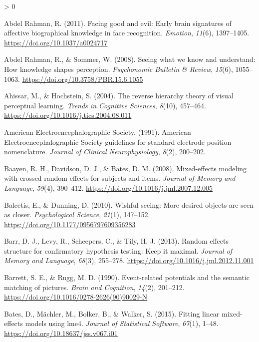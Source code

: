 \documentclass[
  english,
  doc,12pt,twoside,floatsintext]{apa7}
\newlength{\cslhangindent}
\newenvironment{CSLReferences}[2] %
 {%
  \setlength{\parindent}{0pt}
  \ifodd #1 \everypar{\setlength{\hangindent}{\cslhangindent}}\ignorespaces\fi
  \ifnum #2 > 0
  \setlength{\parskip}{#2\baselineskip}
  \fi
 }%
 {}
\begin{document}
\hypertarget{refs}{}
\begin{CSLReferences}{1}{0}
\leavevmode\hypertarget{ref-abdelrahman2011}{}%
Abdel Rahman, R. (2011). Facing good and evil: Early brain signatures of affective biographical knowledge in face recognition. \emph{Emotion}, \emph{11}(6), 1397--1405. \url{https://doi.org/10.1037/a0024717}

\leavevmode\hypertarget{ref-abdelrahman2008}{}%
Abdel Rahman, R., \& Sommer, W. (2008). Seeing what we know and understand: How knowledge shapes perception. \emph{Psychonomic Bulletin \& Review}, \emph{15}(6), 1055--1063. \url{https://doi.org/10.3758/PBR.15.6.1055}

\leavevmode\hypertarget{ref-ahissar2004}{}%
Ahissar, M., \& Hochstein, S. (2004). The reverse hierarchy theory of visual perceptual learning. \emph{Trends in Cognitive Sciences}, \emph{8}(10), 457--464. \url{https://doi.org/10.1016/j.tics.2004.08.011}

\leavevmode\hypertarget{ref-americanelectroencephalographicsociety1991}{}%
American Electroencephalographic Society. (1991). {American Electroencephalographic Society} guidelines for standard electrode position nomenclature. \emph{Journal of Clinical Neurophysiology}, \emph{8}(2), 200--202.

\leavevmode\hypertarget{ref-baayen2008}{}%
Baayen, R. H., Davidson, D. J., \& Bates, D. M. (2008). Mixed-effects modeling with crossed random effects for subjects and items. \emph{Journal of Memory and Language}, \emph{59}(4), 390--412. \url{https://doi.org/10.1016/j.jml.2007.12.005}

\leavevmode\hypertarget{ref-balcetis2010}{}%
Balcetis, E., \& Dunning, D. (2010). Wishful seeing: More desired objects are seen as closer. \emph{Psychological Science}, \emph{21}(1), 147--152. \url{https://doi.org/10.1177/0956797609356283}

\leavevmode\hypertarget{ref-barr2013}{}%
Barr, D. J., Levy, R., Scheepers, C., \& Tily, H. J. (2013). Random effects structure for confirmatory hypothesis testing: Keep it maximal. \emph{Journal of Memory and Language}, \emph{68}(3), 255--278. \url{https://doi.org/10.1016/j.jml.2012.11.001}

\leavevmode\hypertarget{ref-barrett1990}{}%
Barrett, S. E., \& Rugg, M. D. (1990). Event-related potentials and the semantic matching of pictures. \emph{Brain and Cognition}, \emph{14}(2), 201--212. \url{https://doi.org/10.1016/0278-2626(90)90029-N}

\leavevmode\hypertarget{ref-R-lme4}{}%
Bates, D., Mächler, M., Bolker, B., \& Walker, S. (2015). Fitting linear mixed-effects models using {lme4}. \emph{Journal of Statistical Software}, \emph{67}(1), 1--48. \url{https://doi.org/10.18637/jss.v067.i01}


\end{CSLReferences}
\end{document}
